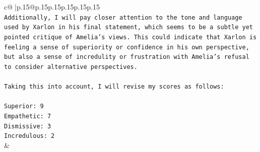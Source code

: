 \documentclass{article}
\begin{document}
{\begin{supertabular}{c@{$\;$}|p{.15\linewidth}@{}p{.15\linewidth}p{.15\linewidth}p{.15\linewidth}p{.15\linewidth}p{.15\linewidth}}
{{{\\ 
\texttt{Additionally, I will pay closer attention to the tone and language used by Xarlon in his final statement, which seems to be a subtle yet pointed critique of Amelia's views. This could indicate that Xarlon is feeling a sense of superiority or confidence in his own perspective, but also a sense of incredulity or frustration with Amelia's refusal to consider alternative perspectives.} \\
\\ 
\texttt{Taking this into account, I will revise my scores as follows:} \\
\\ 
\texttt{Superior: 9} \\
\texttt{Empathetic: 7} \\
\texttt{Dismissive: 3} \\
\texttt{Incredulous: 2} \\
            }
        }
    }
    & \\ \\

\end{supertabular}
}
\end{document}
